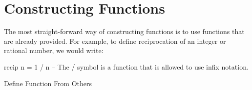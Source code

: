 \section{Constructing Functions}\label{sec:Constructing_Functions}
The most straight-forward way of constructing functions is to use functions that are already provided.
For example, to define reciprocation of an integer or rational number, we would write:
\begin{listing}[h!tbp]
\begin{haskellsource}
  recip n = 1 / n
  -- The / symbol is a function that is allowed to use infix notation.
\end{haskellsource}
\caption{Define Function From Others}
\label{lst:Define_Func_From_Others}
\end{listing}



